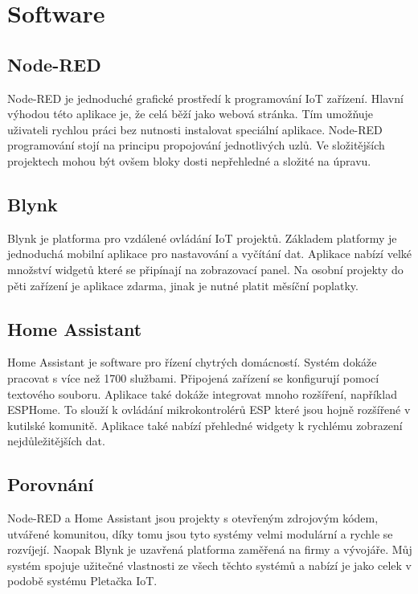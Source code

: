 \newpage

\section{Software}


\subsection{Node-RED}
Node-RED je jednoduché grafické prostředí k programování IoT zařízení. 
Hlavní výhodou této aplikace je, že celá běží jako webová stránka. 
Tím umožňuje uživateli rychlou práci bez nutnosti instalovat speciální aplikace.
Node-RED programování stojí na principu propojování jednotlivých uzlů.
Ve složitějších projektech mohou být ovšem bloky dosti nepřehledné a složité na úpravu.


\subsection{Blynk}
Blynk je platforma pro vzdálené ovládání IoT projektů.
Základem platformy je jednoduchá mobilní aplikace pro nastavování a vyčítání dat.
Aplikace nabízí velké množství widgetů které se připínají na zobrazovací panel.
Na osobní projekty do pěti zařízení je aplikace zdarma, jinak je nutné platit měsíční poplatky.


\subsection{Home Assistant}
Home Assistant je software pro řízení chytrých domácností. 
Systém dokáže pracovat s více než 1700 službami.
Připojená zařízení se konfigurují pomocí textového souboru.
Aplikace také dokáže integrovat mnoho rozšíření, například ESPHome.
To slouží k ovládání mikrokontrolérů ESP které jsou hojně rozšířené v kutilské komunitě.
Aplikace také nabízí přehledné widgety k rychlému zobrazení nejdůležitějších dat. 


\subsection{Porovnání}
Node-RED a Home Assistant jsou projekty s otevřeným zdrojovým kódem, utvářené komunitou, díky tomu jsou tyto systémy velmi modulární a rychle se rozvíjejí. %
Naopak Blynk je uzavřená platforma zaměřená na firmy a vývojáře.
Můj systém spojuje užitečné vlastnosti ze všech těchto systémů a nabízí je jako celek v podobě systému Pletačka IoT.
